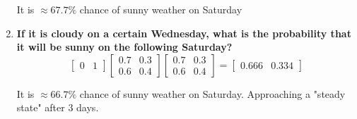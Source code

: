 \documentclass[a4paper]{article}
\begin{document}
\begin{enumerate}
	It is $\approx 67.7\%$ chance of sunny weather on Saturday
	

	\item \textbf{If it is cloudy on a certain Wednesday, what is the probability that it will be sunny on the following Saturday?
	} \\
	
	\begin{equation}
	\begin{bmatrix} 0& 1 \end{bmatrix}\begin{bmatrix} 0.7& 0.3 \\ 0.6& 0.4 \end{bmatrix}\begin{bmatrix} 0.7& 0.3 \\ 0.6& 0.4 \end{bmatrix} = \begin{bmatrix} 0.666& 0.334 \end{bmatrix} 
	\end{equation}

	It is $\approx 66.7\%$ chance of sunny weather on Saturday. Approaching a "steady state" after 3 days.


\end{enumerate}
\end{document}
